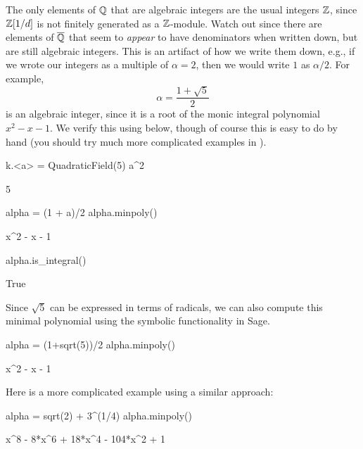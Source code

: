 The only elements of $\mathbb{Q}$ that are algebraic integers are the usual
integers $\mathbb{Z}$, since $\mathbb{Z}[1/d]$ is not finitely generated as a $\mathbb{Z}$-module.
Watch out since there are elements of $\overline{\mathbb{Q}}$ that seem to {\em appear}
to have denominators when written down, but are still algebraic integers.
This is an artifact of how we write them down, e.g., if we wrote
our integers as a multiple of $\alpha=2$, then we would write $1$
as $\alpha/2$. For example,
$$
	\alpha = \frac{1+\sqrt{5}}{2}
$$
is an algebraic integer, since it is a root of the monic integral
polynomial $x^2 - x - 1$.  We verify this using \sage below,
though of course this is easy to do by hand (you should try
much more complicated examples in \sage).
\begin{sagecode}
\begin{sagecell}
k.<a> = QuadraticField(5)
a^2
\end{sagecell}
\begin{sageout}
5
\end{sageout}
\begin{sagecell}
alpha = (1 + a)/2
alpha.minpoly()
\end{sagecell}
\begin{sageout}
x^2 - x - 1
\end{sageout}
\begin{sagecell}
alpha.is_integral()
\end{sagecell}
\begin{sageout}
True
\end{sageout}
\end{sagecode}

Since $\sqrt{5}$ can be expressed in terms of radicals, we can also
compute this minimal polynomial using the symbolic functionality in
Sage.
\begin{sagecode}
\begin{sagecell}
alpha = (1+sqrt(5))/2
alpha.minpoly()
\end{sagecell}
\begin{sageout}
x^2 - x - 1
\end{sageout}
Here is a more complicated example using a similar approach:
\begin{sagecell}
alpha = sqrt(2) + 3^(1/4)
alpha.minpoly()
\end{sagecell}
\begin{sageout}
x^8 - 8*x^6 + 18*x^4 - 104*x^2 + 1
\end{sageout}
\end{sagecode}

